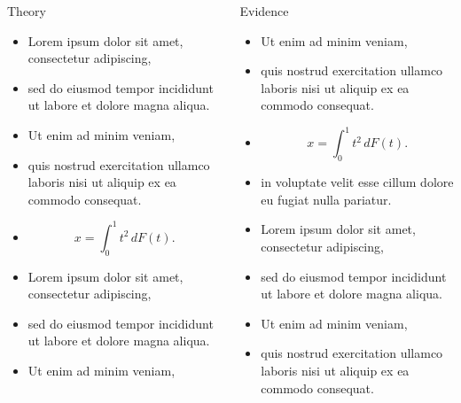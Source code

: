\documentclass[12pt, final]{beamer}
\newlength{\onecolwid}
\newlength{\twocolwid}
\begin{document}
\begin{frame}[t]
\begin{columns}[t]
\begin{column}{\twocolwid}
      \begin{columns}[t]
        \begin{column}{\onecolwid}
          \begin{block}{Theory}
            \begin{itemize}
              \item Lorem ipsum \alert{dolor} sit amet, consectetur adipiscing,
              \item sed do eiusmod tempor incididunt ut labore et dolore magna aliqua.
              \item Ut enim ad minim veniam,
              \item quis nostrud exercitation ullamco laboris nisi ut aliquip ex ea commodo consequat.
              \item $$x = \int_0^1 t^2 \,dF(t).$$
              \item Lorem ipsum \alert{dolor} sit amet, consectetur adipiscing,
              \item sed do eiusmod tempor incididunt ut labore et dolore magna aliqua.
              \item Ut enim ad minim veniam,
            \end{itemize}
          \end{block}
        \end{column}
        \begin{column}{\onecolwid}
          \begin{block}{Evidence}
            \begin{itemize}
              \item Ut enim ad minim veniam,
              \item quis nostrud exercitation ullamco laboris nisi ut aliquip ex ea commodo consequat.
              \item $$x = \int_0^1 t^2 \,dF(t).$$
              \item in voluptate velit \alert{esse cillum dolore} eu fugiat nulla pariatur.
              \item Lorem ipsum \alert{dolor} sit amet, consectetur adipiscing,
              \item sed do eiusmod tempor incididunt ut labore et dolore magna aliqua.
              \item Ut enim ad minim veniam,
              \item quis nostrud exercitation ullamco laboris nisi ut aliquip ex ea commodo consequat.
            \end{itemize}
          \end{block}
        \end{column}
      \end{columns}
    \end{column}
  \end{columns}


\end{frame}
\end{document}
